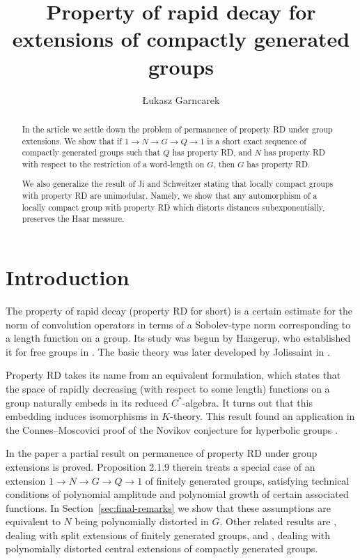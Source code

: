 \documentclass{amsart}
\author{{\L}ukasz Garncarek}
\title{Property of rapid decay for extensions of compactly generated groups}
\theoremstyle{definition}
\theoremstyle{remark}
\begin{document}
\begin{abstract}
  In the article we settle down the problem of permanence of property
  RD under group extensions. We show that if $1\to N\to G\to Q\to 1$
  is a short exact sequence of compactly generated groups such that
  $Q$ has property RD, and $N$ has property RD with respect to the
  restriction of a word-length on $G$, then $G$ has property RD. 

  We also generalize the result of Ji and Schweitzer stating that
  locally compact groups with property RD are unimodular. Namely, we
  show that any automorphism of a locally compact group with property
  RD which distorts distances subexponentially, preserves the Haar measure.
\end{abstract}

\maketitle

\section{Introduction}
\label{sec:introduction}

The property of rapid decay (property RD for short) is a certain
estimate for the norm of convolution operators in terms of a
Sobolev-type norm corresponding to a length function on a group. Its
study was begun by Haagerup, who established it for free groups in
\cite{Haagerup1978}. The basic theory was later developed by
Jolissaint in \cite{Jolissaint1989,Jolissaint1990}. 

Property RD takes its name from an equivalent formulation, which
states that the space of rapidly decreasing (with respect to some
length) functions on a group naturally embeds in its reduced
$C^*$-algebra. It turns out that this embedding induces isomorphisms
in $K$-theory. This result found an application in the
Connes--Moscovici proof of the Novikov conjecture for hyperbolic
groups \cite{Connes1990}.

In the paper \cite{Jolissaint1990} a partial result on permanence of
property RD under group extensions is proved. Proposition 2.1.9
therein treats a special case of an extension $1\to N\to G\to Q \to 1$
of finitely generated groups, satisfying technical conditions of
polynomial amplitude and polynomial growth of certain associated
functions. In Section~\ref{sec:final-remarks} we show that these
assumptions are equivalent to $N$ being polynomially distorted in
$G$. Other related results are \cite[Proposition 1.14]{ChatterjiPhD},
dealing with split extensions of finitely generated groups, and
\cite[Proposition 5.5]{Chatterji2007}, dealing with polynomially
distorted central extensions of compactly generated groups.
\end{document}
